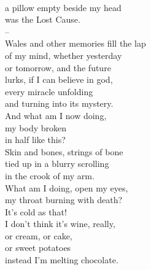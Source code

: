 \documentclass[smalldemyvopaper,11pt,twoside,onecolumn,openright,extrafontsizes]{memoir}
\begin{document}
\\a pillow empty beside my head
\\was the Lost Cause.
\\--
\\Wales and other memories fill the lap
\\of my mind, whether yesterday
\\or tomorrow, and the future
\\lurks, if I can believe in god,
\\every miracle unfolding
\\and turning into its mystery.
\\And what am I now doing,
\\my body broken
\\in half like this?
\\Skin and bones, strings of bone
\\tied up in a blurry scrolling
\\in the crook of my arm.
\\What am I doing, open my eyes,
\\my throat burning with death?
\\It's cold as that!
\\I don't think it's wine, really,
\\or cream, or cake,
\\or sweet potatoes
\\instead I'm melting chocolate.
\end{document}
